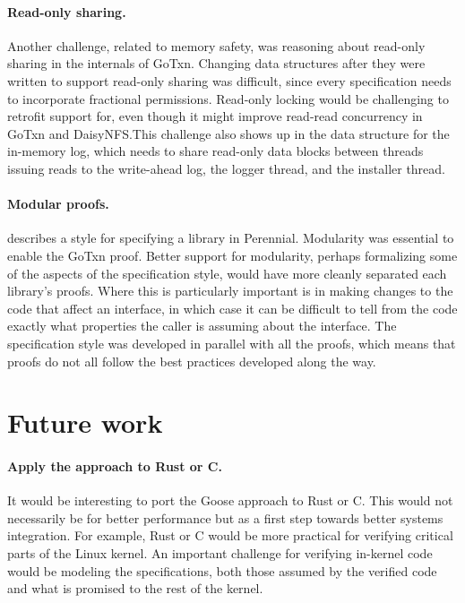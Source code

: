 \paragraph{Read-only sharing.}
Another challenge, related to memory safety, was reasoning about read-only
sharing in the internals of GoTxn. Changing data structures after they were written to support read-only
sharing was difficult, since every specification needs to incorporate fractional
permissions. Read-only locking would be challenging to retrofit support for, even
though it might improve read-read concurrency in GoTxn and DaisyNFS.\@ This challenge
also shows up in the data structure for the in-memory log, which needs to share
read-only data blocks between threads issuing reads to the write-ahead log, the logger
thread, and the installer thread.

\paragraph{Modular proofs.}
 describes a style for specifying a library in Perennial.
Modularity was essential to enable the GoTxn proof. Better support for
modularity, perhaps formalizing some of the aspects of the specification style,
would have more cleanly separated each library's proofs. Where this is
particularly important is in making changes to the code that affect an
interface, in which case it can be difficult to tell from the code exactly what
properties the caller is assuming about the interface. The specification style
was developed in parallel with all the proofs, which means that proofs do not
all follow the best practices developed along the way.

\section{Future work}

\paragraph{Apply the approach to Rust or C.} It would be interesting to port
the Goose approach to Rust or C. This would not necessarily be for better
performance but as a first step towards better systems integration. For example,
Rust or C would be more practical for verifying critical parts of the Linux
kernel. An important challenge for verifying in-kernel code would be modeling
the specifications, both those assumed by the verified code and what is promised
to the rest of the kernel.

